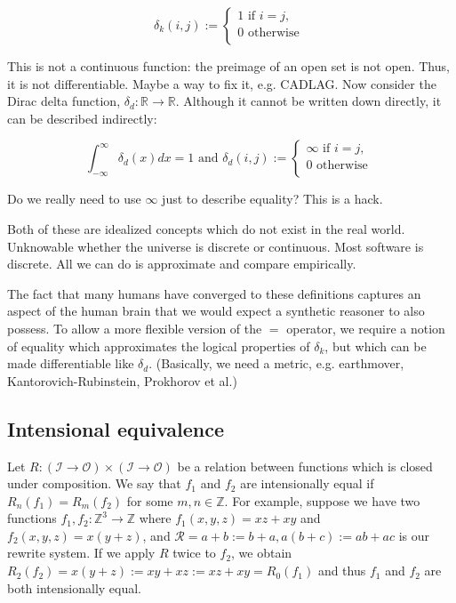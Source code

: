 \documentclass[11pt]{article}
\begin{document}
    $$
    \delta_k(i, j) :=
    \begin{cases}
        1 \text{ if } i = j, \\
        0 \text{ otherwise }\\
    \end{cases}
    $$

    This is not a continuous function: the preimage of an open set is not open. Thus, it is not differentiable. Maybe a way to fix it, e.g. CADLAG. Now consider the Dirac delta function, $\delta_d: \mathbb{R} \rightarrow \mathbb{R}$. Although it cannot be written down directly, it can be described indirectly:

    $$
    \int_{-\infty}^{\infty} \delta_d (x)dx = 1 \text{ and } \delta_d(i, j) :=
    \begin{cases}
        \infty \text{ if } i = j, \\
        0 \text{ otherwise }\\
    \end{cases}
    $$

    Do we really need to use $\infty$ just to describe equality? This is a hack.

    Both of these are idealized concepts which do not exist in the real world. Unknowable whether the universe is discrete or continuous. Most software is discrete. All we can do is approximate and compare empirically.

    The fact that many humans have converged to these definitions captures an aspect of the human brain that we would expect a synthetic reasoner to also possess. To allow a more flexible version of the $=$ operator, we require a notion of equality which approximates the logical properties of $\delta_k$, but which can be made differentiable like $\delta_d$. (Basically, we need a metric, e.g. earthmover, Kantorovich-Rubinstein, Prokhorov et al.)

    \subsection{Intensional equivalence}\label{subsec:intensional-equivalence}

    Let $R: (\mathcal{I} \rightarrow \mathcal{O}) \times (\mathcal{I}\rightarrow \mathcal{O})$ be a relation between functions which is closed under composition. We say that $f_1$ and $f_2$ are intensionally equal if $R_n(f_1)=R_m(f_2)$ for some $m,n \in \mathbb{Z}$. For example, suppose we have two functions $f_1, f_2: \mathbb{Z}^3 \rightarrow \mathbb{Z}$ where $f_1(x, y, z)=xz + xy$ and $f_2(x, y, z)=x(y + z)$, and $\mathcal{R}={a + b := b + a, a(b + c) := ab + ac}$ is our rewrite system. If we apply $R$ twice to $f_2$, we obtain $R_2(f_2)=x(y + z):=xy + xz:=xz + xy=R_0(f_1)$ and thus $f_1$ and $f_2$ are both intensionally equal.
\end{document}
